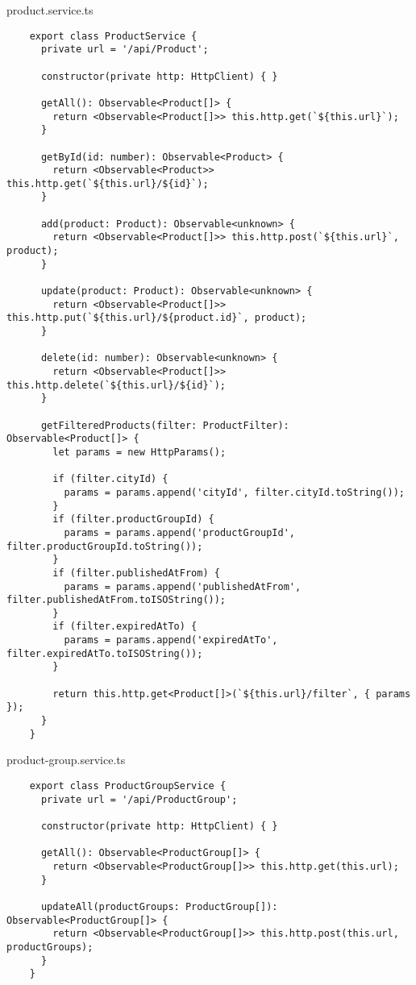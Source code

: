 product.service.ts
\begin{lstlisting}
    export class ProductService {
      private url = '/api/Product';
    
      constructor(private http: HttpClient) { }
    
      getAll(): Observable<Product[]> {
        return <Observable<Product[]>> this.http.get(`${this.url}`);
      }
    
      getById(id: number): Observable<Product> {
        return <Observable<Product>> this.http.get(`${this.url}/${id}`);
      }
    
      add(product: Product): Observable<unknown> {
        return <Observable<Product[]>> this.http.post(`${this.url}`, product);
      }
    
      update(product: Product): Observable<unknown> {
        return <Observable<Product[]>> this.http.put(`${this.url}/${product.id}`, product);
      }
    
      delete(id: number): Observable<unknown> {
        return <Observable<Product[]>> this.http.delete(`${this.url}/${id}`);
      }
    
      getFilteredProducts(filter: ProductFilter): Observable<Product[]> {
        let params = new HttpParams();
    
        if (filter.cityId) {
          params = params.append('cityId', filter.cityId.toString());
        }
        if (filter.productGroupId) {
          params = params.append('productGroupId', filter.productGroupId.toString());
        }
        if (filter.publishedAtFrom) {
          params = params.append('publishedAtFrom', filter.publishedAtFrom.toISOString());
        }
        if (filter.expiredAtTo) {
          params = params.append('expiredAtTo', filter.expiredAtTo.toISOString());
        }
    
        return this.http.get<Product[]>(`${this.url}/filter`, { params });
      }
    }
\end{lstlisting}

product-group.service.ts
\begin{lstlisting}
    export class ProductGroupService {
      private url = '/api/ProductGroup';
    
      constructor(private http: HttpClient) { }
    
      getAll(): Observable<ProductGroup[]> {
        return <Observable<ProductGroup[]>> this.http.get(this.url);
      }
    
      updateAll(productGroups: ProductGroup[]): Observable<ProductGroup[]> {
        return <Observable<ProductGroup[]>> this.http.post(this.url, productGroups);
      }
    }
\end{lstlisting}

